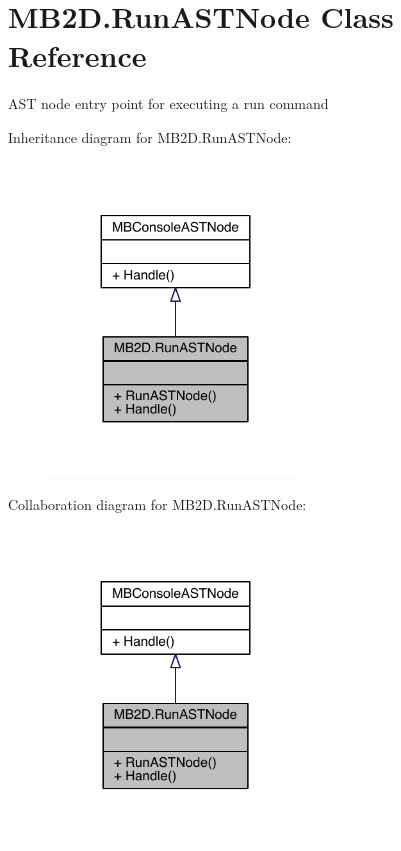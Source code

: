 \hypertarget{class_m_b2_d_1_1_run_a_s_t_node}{}\section{M\+B2\+D.\+Run\+A\+S\+T\+Node Class Reference}
\label{class_m_b2_d_1_1_run_a_s_t_node}


A\+ST node entry point for executing a run command  




Inheritance diagram for M\+B2\+D.\+Run\+A\+S\+T\+Node\+:
\nopagebreak
\begin{figure}[H]
\begin{center}
\leavevmode
\includegraphics[width=191pt]{class_m_b2_d_1_1_run_a_s_t_node__inherit__graph}
\end{center}
\end{figure}


Collaboration diagram for M\+B2\+D.\+Run\+A\+S\+T\+Node\+:
\nopagebreak
\begin{figure}[H]
\begin{center}
\leavevmode
\includegraphics[width=191pt]{class_m_b2_d_1_1_run_a_s_t_node__coll__graph}
\end{center}
\end{figure}
